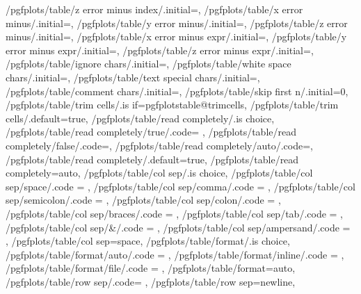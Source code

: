 {	/pgfplots/table/z error minus index/.initial=,
	/pgfplots/table/x error minus/.initial=,
	/pgfplots/table/y error minus/.initial=,
	/pgfplots/table/z error minus/.initial=,
	/pgfplots/table/x error minus expr/.initial=,
	/pgfplots/table/y error minus expr/.initial=,
	/pgfplots/table/z error minus expr/.initial=,
	/pgfplots/table/ignore chars/.initial=,
	/pgfplots/table/white space chars/.initial=,
	/pgfplots/table/text special chars/.initial=,
	/pgfplots/table/comment chars/.initial=,
	/pgfplots/table/skip first n/.initial=0,
	/pgfplots/table/trim cells/.is if=pgfplotstable@trimcells,
	/pgfplots/table/trim cells/.default=true,
	/pgfplots/table/read completely/.is choice,
	/pgfplots/table/read completely/true/.code=	\pgfplots@addplotimpl@readcompletelytrue\def\pgfplots@addplotimpl@readcompletely@auto{0},
	/pgfplots/table/read completely/false/.code=\pgfplots@addplotimpl@readcompletelyfalse\def\pgfplots@addplotimpl@readcompletely@auto{0},
	/pgfplots/table/read completely/auto/.code=\pgfplots@addplotimpl@readcompletelyfalse\def\pgfplots@addplotimpl@readcompletely@auto{1},
	/pgfplots/table/read completely/.default=true,
	/pgfplots/table/read completely=auto,
	/pgfplots/table/col sep/.is choice,
	/pgfplots/table/col sep/space/.code		= {\def\pgfplotstableread@COLSEP@CASE{0}},
	/pgfplots/table/col sep/comma/.code		= {\def\pgfplotstableread@COLSEP@CASE{1}},
	/pgfplots/table/col sep/semicolon/.code	= {\def\pgfplotstableread@COLSEP@CASE{2}},
	/pgfplots/table/col sep/colon/.code		= {\def\pgfplotstableread@COLSEP@CASE{3}},
	/pgfplots/table/col sep/braces/.code	= {\def\pgfplotstableread@COLSEP@CASE{4}},
	/pgfplots/table/col sep/tab/.code		= {\def\pgfplotstableread@COLSEP@CASE{5}},
	/pgfplots/table/col sep/&/.code			= {\def\pgfplotstableread@COLSEP@CASE{6}\pgfplotstable@trimcellstrue},
	/pgfplots/table/col sep/ampersand/.code	= {\def\pgfplotstableread@COLSEP@CASE{6}\pgfplotstable@trimcellstrue},
	/pgfplots/table/col sep=space,
	/pgfplots/table/format/.is choice,
	/pgfplots/table/format/auto/.code		= {\def\pgfplotstableread@FORMAT@CASE{0}},
	/pgfplots/table/format/inline/.code		= {\def\pgfplotstableread@FORMAT@CASE{1}},
	/pgfplots/table/format/file/.code		= {\def\pgfplotstableread@FORMAT@CASE{2}},
	/pgfplots/table/format=auto,
	/pgfplots/table/row sep/.code={%
	},%
	/pgfplots/table/row sep=newline,
}

